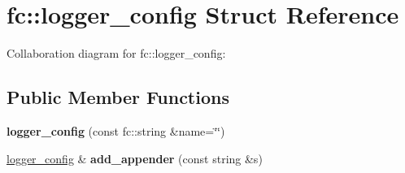 \hypertarget{structfc_1_1logger__config}{}\section{fc\+:\+:logger\+\_\+config Struct Reference}
\label{structfc_1_1logger__config}


Collaboration diagram for fc\+:\+:logger\+\_\+config\+:
\subsection*{Public Member Functions}
\begin{DoxyCompactItemize}
\item 
\mbox{\label{structfc_1_1logger__config_aeeaf40acd71179026b3917c3499dd956}} 
{\bfseries logger\+\_\+config} (const fc\+::string \&name=\char`\"{}\char`\"{})
\item 
\mbox{\label{structfc_1_1logger__config_a5306215de0446b2576f4592bcbcdffb0}} 
\mbox{\hyperlink{structfc_1_1logger__config}{logger\+\_\+config}} \& {\bfseries add\+\_\+appender} (const string \&s)
\end{DoxyCompactItemize}
